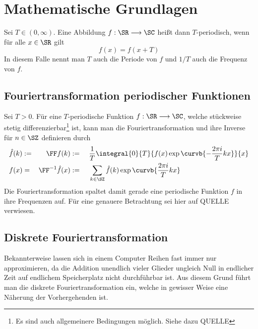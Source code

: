 \section{Mathematische Grundlagen} %
\label{sec:mathematische_grundlagen}

	\begin{definition*}
		Sei $T\in(0,\infty)$.
		Eine Abbildung $f:\SR\longrightarrow\SC$ heißt dann $T$-periodisch, wenn für alle $x\in\SR$ gilt
		$$ f(x) = f(x+T) $$
		In diesem Falle nennt man $T$ auch die Periode von $f$ und $1/T$ auch die Frequenz von $f$.
	\end{definition*}

	\subsection{Fouriertransformation periodischer Funktionen} %
	\label{sub:fouriertransformation_periodischer_funktionen}
	
		Sei $T>0$. Für eine $T$-periodische Funktion $f:\SR\longrightarrow\SC$, welche stückweise stetig differenzierbar\footnote{Es sind auch allgemeinere Bedingungen möglich. Siehe dazu QUELLE} ist, kann man die Fouriertransformation und ihre Inverse für $n\in\SZ$ definieren durch
		\begin{alignat*}{4}
			&\hat{f}(k) := &\FF f(k) &:= &&\ \frac{1}{T}\integral{0}{T}{ f(x)\exp\curvb{ -\frac{2\pi i}{T}kx } }{x} \\
			&f(x) = &\FF^{-1}\hat{f}(x) &:= &&\ \sum_{k\in\SZ}\hat{f}(k)\exp\curvb{ \frac{2\pi i}{T}kx }
		\end{alignat*} 
		Die Fouriertransformation spaltet damit gerade eine periodische Funktion $f$ in ihre Frequenzen auf.
		Für eine genauere Betrachtung sei hier auf QUELLE verwiesen.


	\subsection{Diskrete Fouriertransformation} %
	\label{sub:diskrete_fouriertransformation}

		Bekannterweise lassen sich in einem Computer Reihen fast immer nur approximieren, da die Addition unendlich vieler Glieder ungleich Null in endlicher Zeit auf endlichem Speicherplatz nicht durchführbar ist.
		Aus diesem Grund führt man die diskrete Fouriertransformation ein, welche in gewisser Weise eine Näherung der Vorhergehenden ist.

